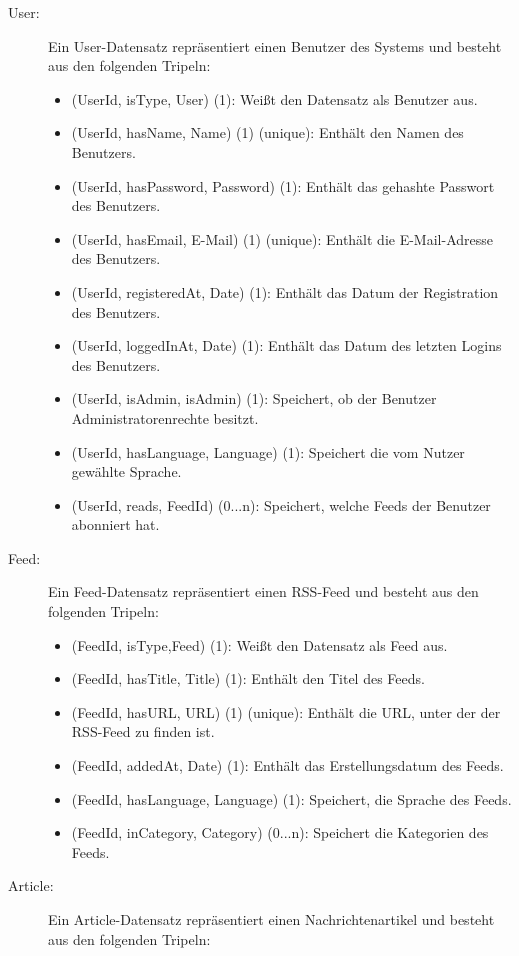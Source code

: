 \begin{description} 
\item[User:] Ein User-Datensatz repräsentiert einen Benutzer des Systems und besteht aus den folgenden Tripeln:
\begin{itemize}
  \item (UserId, isType, User) (1): Weißt den Datensatz als Benutzer aus.
  \item (UserId, hasName, Name) (1) (unique): Enthält den Namen des Benutzers.
  \item (UserId, hasPassword, Password) (1): Enthält das gehashte Passwort des Benutzers.
  \item (UserId, hasEmail, E-Mail) (1) (unique): Enthält die E-Mail-Adresse des Benutzers.
  \item (UserId, registeredAt, Date) (1): Enthält das Datum der Registration des Benutzers.
  \item (UserId, loggedInAt, Date) (1): Enthält das Datum des letzten Logins des Benutzers.
  \item (UserId, isAdmin, isAdmin) (1): Speichert, ob der Benutzer Administratorenrechte besitzt.
  \item (UserId, hasLanguage, Language) (1): Speichert die vom Nutzer gewählte Sprache.
  \item (UserId, reads, FeedId) (0...n): Speichert, welche Feeds der Benutzer abonniert hat.
\end{itemize}
\item[Feed:] Ein Feed-Datensatz repräsentiert einen RSS-Feed und besteht aus den folgenden Tripeln:
\begin{itemize}
  \item (FeedId, isType,Feed) (1): Weißt den Datensatz als Feed aus.
  \item (FeedId, hasTitle, Title) (1): Enthält den Titel des Feeds.
  \item (FeedId, hasURL, URL) (1) (unique): Enthält die URL, unter der der RSS-Feed zu finden ist.
  \item (FeedId, addedAt, Date) (1): Enthält das Erstellungsdatum des Feeds.
  \item (FeedId, hasLanguage, Language) (1): Speichert, die Sprache des Feeds.
  \item (FeedId, inCategory, Category) (0...n): Speichert die Kategorien des Feeds.
\end{itemize}
\item[Article:] Ein Article-Datensatz repräsentiert einen Nachrichtenartikel und besteht aus den folgenden Tripeln:

\end{description}
